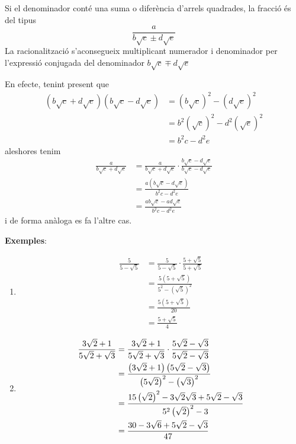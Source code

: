\begin{cas}
Si el denominador conté una suma o diferència d’arrels quadrades,
la fracció és del tipus%
\begin{equation*}
\frac{a}{b\sqrt{c}\pm d\sqrt{e}}
\end{equation*}%
La racionalització s’aconsegueix multiplicant numerador i denominador per
l’expressió conjugada del denominador $b\sqrt{c}\mp d\sqrt{e}$
\end{cas}

En efecte, tenint present que%
\begin{align*}
\left( b\sqrt{c}+d\sqrt{e}\right) \left( b\sqrt{c}-d\sqrt{e}\right)
&=\left( b\sqrt{c}\right) ^{2}-\left( d\sqrt{e}\right) ^{2} \\
&=b^{2}\left( \sqrt{c}\right) ^{2}-d^{2}\left( \sqrt{e}\right) ^{2} \\
&=b^{2}c-d^{2}e
\end{align*}%
aleshores tenim%
\begin{align*}
\frac{a}{b\sqrt{c}+d\sqrt{e}} &=\frac{a}{b\sqrt{c}+d\sqrt{e}}\cdot \frac{b%
\sqrt{c}-d\sqrt{e}}{b\sqrt{c}-d\sqrt{e}} \\
&=\frac{a\left( b\sqrt{c}-d\sqrt{e}\right) }{b^{2}c-d^{2}e} \\
&=\frac{ab\sqrt{c}-ad\sqrt{e}}{b^{2}c-d^{2}e}
\end{align*}%
i de forma anàloga es fa l’altre cas.

\textbf{Exemples}:

\begin{enumerate}
\item 
\begin{align*}
\frac{5}{5-\sqrt{5}} &=\frac{5}{5-\sqrt{5}}\cdot \frac{5+\sqrt{5}}{5+\sqrt{5%
}} \\
&=\frac{5\left( 5+\sqrt{5}\right) }{5^{2}-\left( \sqrt{5}\right) ^{2}} \\
&=\frac{5\left( 5+\sqrt{5}\right) }{20} \\
&=\frac{5+\sqrt{5}}{4}
\end{align*}

\item 
\begin{align*}
\frac{3\sqrt{2}+1}{5\sqrt{2}+\sqrt{3}} &=\frac{3\sqrt{2}+1}{5\sqrt{2}+\sqrt{%
3}}\cdot \frac{5\sqrt{2}-\sqrt{3}}{5\sqrt{2}-\sqrt{3}} \\
&=\frac{\left( 3\sqrt{2}+1\right) \left( 5\sqrt{2}-\sqrt{3}\right) }{\left(
5\sqrt{2}\right) ^{2}-\left( \sqrt{3}\right) ^{2}} \\
&=\frac{15\left( \sqrt{2}\right) ^{2}-3\sqrt{2}\sqrt{3}+5\sqrt{2}-\sqrt{3}}{%
5^{2}\left( \sqrt{2}\right) ^{2}-3} \\
&=\frac{30-3\sqrt{6}+5\sqrt{2}-\sqrt{3}}{47}
\end{align*}
\end{enumerate}

